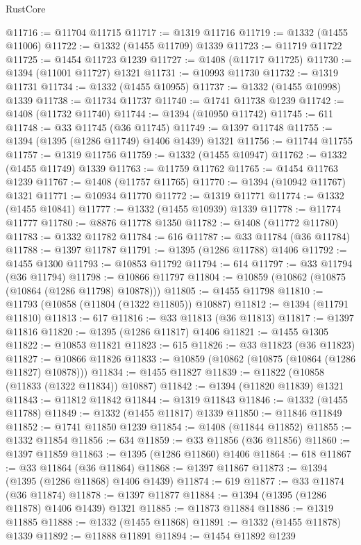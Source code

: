 \begin{lexlean}{RustCore}
\begin{coremodule}
@11716 := @11704 @11715
@11717 := @1319 @11716
@11719 := @1332 (@1455 @11006)
@11722 := @1332 (@1455 @11709) @1339
@11723 := @11719 @11722
@11725 := @1454 @11723 @1239
@11727 := @1408 (@11717 @11725)
@11730 := @1394 (@11001 @11727) @1321
@11731 := @10993 @11730
@11732 := @1319 @11731
@11734 := @1332 (@1455 @10955)
@11737 := @1332 (@1455 @10998) @1339
@11738 := @11734 @11737
@11740 := @1741 @11738 @1239
@11742 := @1408 (@11732 @11740)
@11744 := @1394 (@10950 @11742)
@11745 := 611
@11748 := @33 @11745 (@36 @11745)
@11749 := @1397 @11748
@11755 := @1394 (@1395 (@1286 @11749) @1406 @1439) @1321
@11756 := @11744 @11755
@11757 := @1319 @11756
@11759 := @1332 (@1455 @10947)
@11762 := @1332 (@1455 @11749) @1339
@11763 := @11759 @11762
@11765 := @1454 @11763 @1239
@11767 := @1408 (@11757 @11765)
@11770 := @1394 (@10942 @11767) @1321
@11771 := @10934 @11770
@11772 := @1319 @11771
@11774 := @1332 (@1455 @10841)
@11777 := @1332 (@1455 @10939) @1339
@11778 := @11774 @11777
@11780 := @8876 @11778 @1350
@11782 := @1408 (@11772 @11780)
@11783 := @1332 @11782
@11784 := 616
@11787 := @33 @11784 (@36 @11784)
@11788 := @1397 @11787
@11791 := @1395 (@1286 @11788) @1406
@11792 := @1455 @1300
@11793 := @10853 @11792
@11794 := 614
@11797 := @33 @11794 (@36 @11794)
@11798 := @10866 @11797
@11804 := @10859 (@10862 (@10875 (@10864 (@1286 @11798) @10878)))
@11805 := @1455 @11798
@11810 := @11793 (@10858 (@11804 (@1322 @11805)) @10887)
@11812 := @1394 (@11791 @11810)
@11813 := 617
@11816 := @33 @11813 (@36 @11813)
@11817 := @1397 @11816
@11820 := @1395 (@1286 @11817) @1406
@11821 := @1455 @1305
@11822 := @10853 @11821
@11823 := 615
@11826 := @33 @11823 (@36 @11823)
@11827 := @10866 @11826
@11833 := @10859 (@10862 (@10875 (@10864 (@1286 @11827) @10878)))
@11834 := @1455 @11827
@11839 := @11822 (@10858 (@11833 (@1322 @11834)) @10887)
@11842 := @1394 (@11820 @11839) @1321
@11843 := @11812 @11842
@11844 := @1319 @11843
@11846 := @1332 (@1455 @11788)
@11849 := @1332 (@1455 @11817) @1339
@11850 := @11846 @11849
@11852 := @1741 @11850 @1239
@11854 := @1408 (@11844 @11852)
@11855 := @1332 @11854
@11856 := 634
@11859 := @33 @11856 (@36 @11856)
@11860 := @1397 @11859
@11863 := @1395 (@1286 @11860) @1406
@11864 := 618
@11867 := @33 @11864 (@36 @11864)
@11868 := @1397 @11867
@11873 := @1394 (@1395 (@1286 @11868) @1406 @1439)
@11874 := 619
@11877 := @33 @11874 (@36 @11874)
@11878 := @1397 @11877
@11884 := @1394 (@1395 (@1286 @11878) @1406 @1439) @1321
@11885 := @11873 @11884
@11886 := @1319 @11885
@11888 := @1332 (@1455 @11868)
@11891 := @1332 (@1455 @11878) @1339
@11892 := @11888 @11891
@11894 := @1454 @11892 @1239

\end{coremodule}
\end{lexlean}
